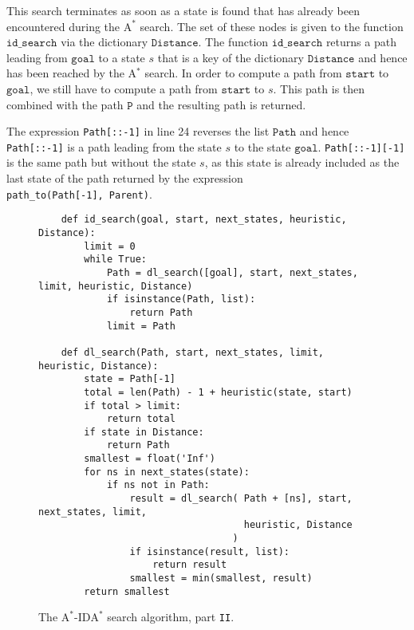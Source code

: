 \begin{enumerate}
      This search terminates as soon as a state is found
      that has already been encountered during the $\mathrm{A}^*$ search.  The set of these nodes is given to
      the function $\texttt{id\_search}$ via the dictionary $\texttt{Distance}$.  The function
      $\texttt{id\_search}$ returns a path leading from $\texttt{goal}$ to a state $s$ that is a key of the
      dictionary $\texttt{Distance}$ and hence has been reached by the  A$^*$ search. 
      In order to compute a path from $\texttt{start}$ to $\texttt{goal}$, we still have to compute a
      path from $\texttt{start}$ to $s$.  This path is then combined with the path $\texttt{P}$ and the resulting path
      is returned.

      The expression \texttt{Path[::-1]} in line 24 reverses the list $\texttt{Path}$ and 
      hence \texttt{Path[::-1]} is a path leading from the state $s$ to the state $\texttt{goal}$.
      \texttt{Path[::-1][-1]} is the same path but without the state $s$, as this state is already included 
      as the last state of the path returned by the expression
      \\[0.2cm]
      \hspace*{1.3cm}
      \texttt{path\_to(Path[-1], Parent)}.
\end{enumerate}


\begin{figure}[!ht]
\centering
\begin{verbatim}
    def id_search(goal, start, next_states, heuristic, Distance):
        limit = 0
        while True:
            Path = dl_search([goal], start, next_states, limit, heuristic, Distance)
            if isinstance(Path, list):
                return Path
            limit = Path
    
    def dl_search(Path, start, next_states, limit, heuristic, Distance):
        state = Path[-1]
        total = len(Path) - 1 + heuristic(state, start)
        if total > limit:
            return total
        if state in Distance:
            return Path
        smallest = float('Inf')
        for ns in next_states(state):
            if ns not in Path:
                result = dl_search( Path + [ns], start, next_states, limit, 
                                    heuristic, Distance
                                  )
                if isinstance(result, list):
                    return result
                smallest = min(smallest, result)
        return smallest 
\end{verbatim}
\vspace*{-0.3cm}
\caption{The $\mathrm{A}^*$-$\mathrm{IDA}^*$ search algorithm, part \texttt{II}.}
\label{fig:A-Star-Ida-Star.ipynb-2}
\end{figure}

